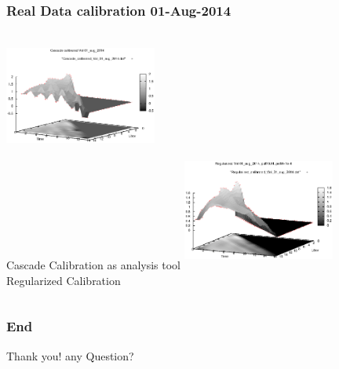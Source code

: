 \documentclass[8pt]{beamer}
\begin{document}
\begin{frame}
\frametitle{Real Data calibration 01-Aug-2014}
\begin{columns}[t]
\centering
\includegraphics[width=5cm,height=3.5cm]{Cascade_calibrated_Vol_01_aug_2014} \\
Cascade Calibration as analysis tool
\centering
\includegraphics[width=5cm,height=4cm]{Regularized_calibrated_Vol_01_aug_2014}\\
Regularized Calibration
\end{columns}
\end{frame}




\begin{frame}
\frametitle{End}
\begin{center}
Thank you! any Question?
\end{center}

\end{frame}
\end{document}
